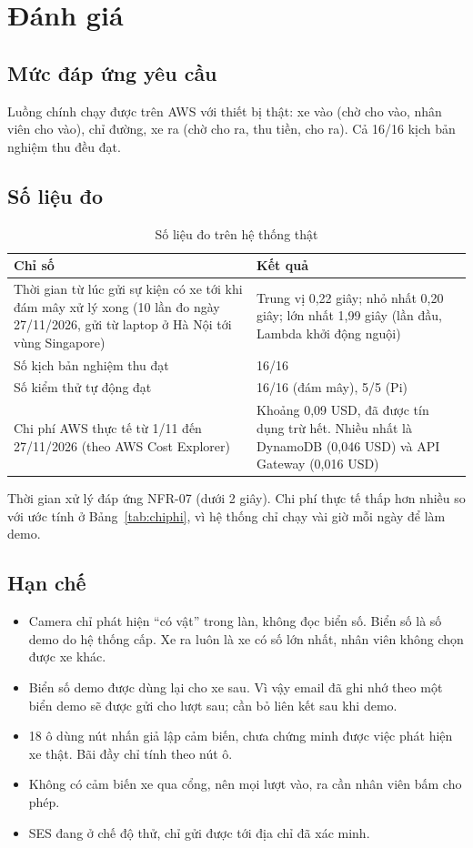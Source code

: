 \section{Đánh giá}

\subsection{Mức đáp ứng yêu cầu}

Luồng chính chạy được trên AWS với thiết bị thật: xe vào (chờ cho vào, nhân viên cho vào), chỉ đường, xe ra (chờ cho ra, thu tiền, cho ra). Cả 16/16 kịch bản nghiệm thu đều đạt.

\subsection{Số liệu đo}

\begin{table}[H]
\centering
\caption{Số liệu đo trên hệ thống thật}
\label{tab:solieu}
\begin{tabularx}{\textwidth}{@{}LP{5.6cm}@{}}
\toprule
\textbf{Chỉ số} & \textbf{Kết quả} \\ \midrule
Thời gian từ lúc gửi sự kiện có xe tới khi đám mây xử lý xong (10 lần đo ngày 27/11/2026, gửi từ laptop ở Hà Nội tới vùng Singapore) & Trung vị 0,22 giây; nhỏ nhất 0,20 giây; lớn nhất 1,99 giây (lần đầu, Lambda khởi động nguội) \\
Số kịch bản nghiệm thu đạt & 16/16 \\
Số kiểm thử tự động đạt & 16/16 (đám mây), 5/5 (Pi) \\
Chi phí AWS thực tế từ 1/11 đến 27/11/2026 (theo AWS Cost Explorer) & Khoảng 0,09 USD, đã được tín dụng trừ hết. Nhiều nhất là DynamoDB (0,046 USD) và API Gateway (0,016 USD) \\
\bottomrule
\end{tabularx}
\end{table}

Thời gian xử lý đáp ứng NFR-07 (dưới 2 giây). Chi phí thực tế thấp hơn nhiều so với ước tính ở Bảng~\ref{tab:chiphi}, vì hệ thống chỉ chạy vài giờ mỗi ngày để làm demo.

\subsection{Hạn chế}

\begin{itemize}
  \item Camera chỉ phát hiện ``có vật'' trong làn, không đọc biển số. Biển số là số demo do hệ thống cấp. Xe ra luôn là xe có số lớn nhất, nhân viên không chọn được xe khác.
  \item Biển số demo được dùng lại cho xe sau. Vì vậy email đã ghi nhớ theo một biển demo sẽ được gửi cho lượt sau; cần bỏ liên kết sau khi demo.
  \item 18 ô dùng nút nhấn giả lập cảm biến, chưa chứng minh được việc phát hiện xe thật. Bãi đầy chỉ tính theo nút ô.
  \item Không có cảm biến xe qua cổng, nên mọi lượt vào, ra cần nhân viên bấm cho phép.
  \item SES đang ở chế độ thử, chỉ gửi được tới địa chỉ đã xác minh.
\end{itemize}
